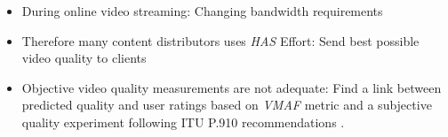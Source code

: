 \begin{itemize}
	\item During online video streaming:
	\newline Changing bandwidth requirements
	\item Therefore many content distributors uses \textit{HAS} \cite{seufert:2015:hassurvey}
	\newline Effort: Send best possible video quality to clients 
	\item Objective video quality measurements are not adequate:
	\newline Find a link between predicted quality and user ratings based on \textit{VMAF} metric \cite{lin2013:mmf,lin2014:fvqa} and a subjective quality experiment following ITU P.910 recommendations \cite{rec1998p}.
\end{itemize}